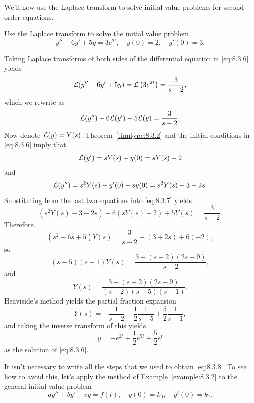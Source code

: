 \documentclass{ximera}
\begin{document}
We'll now use the Laplace transform to solve initial value problems
for  second order equations.

\begin{example}\label{example:8.3.2}
Use the Laplace transform to solve the initial value problem
\begin{equation}\label{eq:8.3.6}
y''-6y'+5y=3e^{2t},\quad y(0)=2, \quad   y'(0)=3.
\end{equation}
\begin{explanation}
Taking Laplace transforms of both sides of the differential equation
in \eqref{eq:8.3.6} yields
$$
{\cal L}(y''-6y'+5y)={\cal L}\left(3e^{2t}\right)=\frac{3}{s-2},
$$
which we rewrite as
\begin{equation}\label{eq:8.3.7}
{\cal L}(y'')-6{\cal L}(y')+5{\cal L}(y)=\frac{3}{s-2}.
\end{equation}
Now denote ${\cal L}(y)=Y(s)$. Theorem~\ref{thmtype:8.3.2} and the
initial conditions in \eqref{eq:8.3.6} imply that
$$
{\cal L}(y')=sY(s)-y(0)=sY(s)-2
$$
and
$$
{\cal L}(y'')=s^2Y(s)-y'(0)-sy(0)=s^2Y(s)-3-2s.
$$
Substituting from the last two equations into  \eqref{eq:8.3.7} yields
$$
\left(s^2Y(s)-3-2s\right)-6\left(sY(s)-2\right)+5Y(s)=\frac{3}{s-2}.
$$
Therefore
\begin{equation}\label{eq:8.3.8}
(s^2-6s+5)Y(s)=\frac{3}{s-2}+(3+2s)+6(-2),
\end{equation}
so
$$
(s-5)(s-1)Y(s)=\frac{3+(s-2)(2s-9)}{s-2},
$$
and
$$
Y(s)=\frac{3+(s-2)(2s-9)}{(s-2)(s-5)(s-1)}.
$$
Heaviside's method yields the partial fraction expansion
$$
Y(s)=-\frac{1}{s-2}+\frac{1}{2}\frac{1}{s-5}+\frac{5}{2}\frac{1}{s-1},
$$
and taking the inverse transform of this yields
$$
y=-e^{2t}+\frac{1}{2}e^{5t}+\frac{5}{2}e^t
$$
as the solution of  \eqref{eq:8.3.6}.
\end{explanation}
\end{example}

It isn't necessary to write all the steps that we used to obtain
\eqref{eq:8.3.8}. To see how to avoid this, let's apply the method of
Example~\ref{example:8.3.2} to the general initial value problem
\begin{equation}\label{eq:8.3.9}
ay''+by'+cy=f(t), \quad  y(0)=k_0,\quad y'(0)=k_1.
\end{equation}
\end{document}
